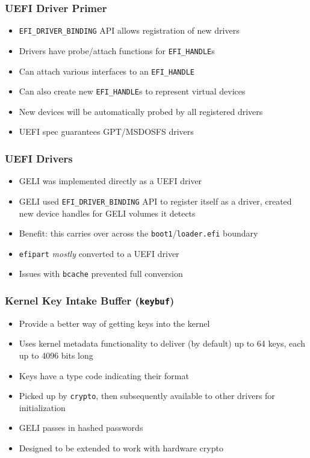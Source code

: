 \documentclass{beamer}
\begin{document}
\begin{frame}
  \frametitle{UEFI Driver Primer}
  \begin{itemize}
  \item \texttt{EFI\_DRIVER\_BINDING} API allows registration of new drivers
  \item Drivers have probe/attach functions for \texttt{EFI\_HANDLE}s
  \item Can attach various interfaces to an \texttt{EFI\_HANDLE}
  \item Can also create new \texttt{EFI\_HANDLE}s to represent virtual devices
  \item New devices will be automatically probed by all registered drivers
  \item UEFI spec guarantees GPT/MSDOSFS drivers
  \end{itemize}
\end{frame}

\begin{frame}
  \frametitle{UEFI Drivers}
  \begin{itemize}
  \item GELI was implemented directly as a UEFI driver
  \item GELI used \texttt{EFI\_DRIVER\_BINDING} API to register itself
    as a driver, created new device handles for GELI volumes it detects
  \item Benefit: this carries over across the
    \texttt{boot1}/\texttt{loader.efi} boundary
  \item \texttt{efipart} \emph{mostly} converted to a UEFI driver
  \item Issues with \texttt{bcache} prevented full conversion
  \end{itemize}
\end{frame}

\begin{frame}
  \frametitle{Kernel Key Intake Buffer (\texttt{keybuf})}
  \begin{itemize}
  \item Provide a better way of getting keys into the kernel
  \item Uses kernel metadata functionality to deliver (by default) up
    to 64 keys, each up to 4096 bits long
  \item Keys have a type code indicating their format
  \item Picked up by \texttt{crypto}, then subsequently available to
    other drivers for initialization
  \item GELI passes in hashed passwords
  \item Designed to be extended to work with hardware crypto
  \end{itemize}
\end{frame}
\end{document}
